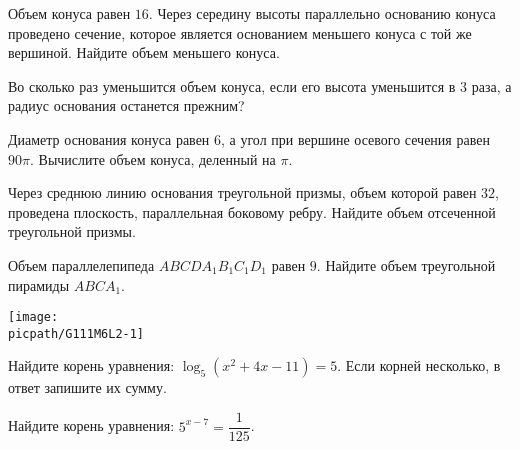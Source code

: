 \begin{class}[number=2]
\begin{listofex}
		\item Объем конуса равен \(16\). Через середину высоты параллельно основанию конуса проведено сечение, которое является основанием меньшего конуса с той же вершиной. Найдите объем меньшего конуса.
		\item Во сколько раз уменьшится объем конуса, если его высота уменьшится в \(3\) раза, а радиус основания останется прежним?
		\item Диаметр основания конуса равен \(6\), а угол при вершине осевого сечения равен \(90\pi \). Вычислите объем конуса, деленный на \( \pi \).
		\item Через среднюю линию основания треугольной призмы, объем которой равен \(32\), проведена плоскость, параллельная боковому ребру. Найдите объем отсеченной треугольной призмы.
		\item 
		\begin{minipage}[t]{\bodywidth}
			Объем параллелепипеда \(ABCDA_1B_1C_1D_1\) равен \(9\). Найдите объем треугольной пирамиды \(ABCA_1\).
		\end{minipage}
		\hspace{0.02\linewidth}
		\begin{minipage}[t]{\picwidth}
			\texttt{[image: \\picpath/G111M6L2-1]}
		\end{minipage}
		\item Найдите корень уравнения: \( \log_5(x^2+4x-11)=5 \). Если корней несколько, в ответ запишите их сумму.
		\item Найдите корень уравнения: \( 5^{x-7}=\dfrac{1}{125} \).
	\end{listofex}
\end{class}

